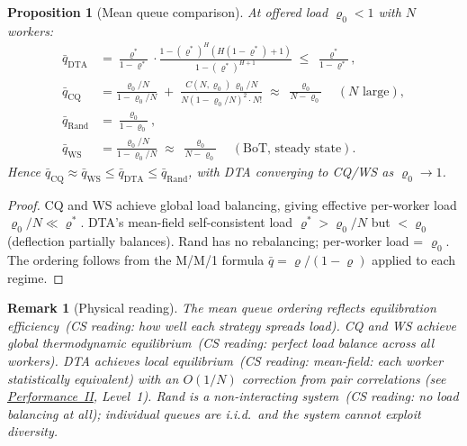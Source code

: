 \documentclass[11pt,a4paper]{article}
\newtheorem{proposition}[theorem]{Proposition}
\newtheorem{remark}{Remark}[section]
\newcommand{\physics}[2]{#1\ \textnormal{(\emph{CS reading}: #2)}}
\begin{document}
\begin{proposition}[Mean queue comparison]\label{prop:mean_queue}
At offered load $\varrho_0 < 1$ with $N$ workers:
\begin{align}
  \bar q_{\mathrm{DTA}} &= \frac{\varrho^*}{1-\varrho^*}
     \cdot \frac{1 - (\varrho^*)^H (H(1-\varrho^*)+1)}{1 - (\varrho^*)^{H+1}}
     \;\le\; \frac{\varrho^*}{1-\varrho^*}, \label{eq:q_dta}\\
  \bar q_{\mathrm{CQ}} &= \frac{\varrho_0/N}{1 - \varrho_0/N}
     \;+\; \frac{C(N,\varrho_0)\,\varrho_0/N}{N(1-\varrho_0/N)^2 \cdot N!}
     \;\approx\; \frac{\varrho_0}{N - \varrho_0}\quad(N \text{ large}), \label{eq:q_cq}\\
  \bar q_{\mathrm{Rand}} &= \frac{\varrho_0}{1 - \varrho_0}, \label{eq:q_rand}\\
  \bar q_{\mathrm{WS}} &= \frac{\varrho_0/N}{1-\varrho_0/N}
     \;\approx\; \frac{\varrho_0}{N - \varrho_0}
     \quad(\text{BoT, steady state}). \label{eq:q_ws}
\end{align}
Hence $\bar q_{\mathrm{CQ}} \approx \bar q_{\mathrm{WS}} \le \bar q_{\mathrm{DTA}} \le \bar q_{\mathrm{Rand}}$,
with DTA converging to CQ/WS as $\varrho_0 \to 1$.
\end{proposition}

\begin{proof}
CQ and WS achieve global load balancing, giving effective per-worker load
$\varrho_0/N \ll \varrho^*$.  DTA's mean-field self-consistent load
$\varrho^* > \varrho_0/N$ but $< \varrho_0$ (deflection partially balances).
Rand has no rebalancing; per-worker load = $\varrho_0$.  The ordering follows
from the M/M/1 formula $\bar q = \varrho/(1-\varrho)$ applied to each regime.
\end{proof}

\begin{remark}[Physical reading]
The mean queue ordering reflects
\physics{equilibration efficiency}{how well each strategy spreads load}.
CQ and WS achieve \physics{global thermodynamic equilibrium}
{perfect load balance across all workers}.
DTA achieves \physics{local equilibrium}{mean-field: each worker
statistically equivalent} with an $O(1/N)$ correction from pair correlations
(see \hyperref[chap:kinetic_theory]{Performance~II}, Level~1).
Rand is a \physics{non-interacting system}{no load balancing at all};
individual queues are i.i.d.\ and the system cannot exploit diversity.
\end{remark}

\end{document}
